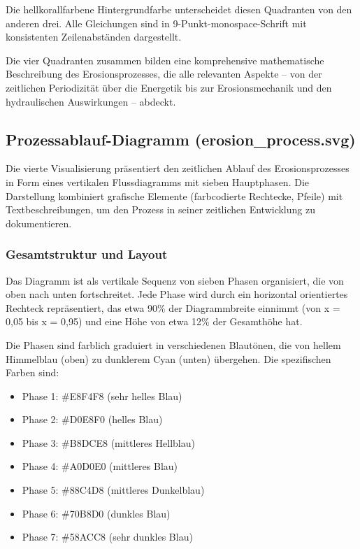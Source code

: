 Die hellkorallfarbene Hintergrundfarbe unterscheidet diesen Quadranten von den anderen drei. Alle Gleichungen sind in 9-Punkt-monospace-Schrift mit konsistenten Zeilenabständen dargestellt.

Die vier Quadranten zusammen bilden eine komprehensive mathematische Beschreibung des Erosionsprozesses, die alle relevanten Aspekte -- von der zeitlichen Periodizität über die Energetik bis zur Erosionsmechanik und den hydraulischen Auswirkungen -- abdeckt.

\subsection{Prozessablauf-Diagramm (erosion\_process.svg)}

Die vierte Visualisierung präsentiert den zeitlichen Ablauf des Erosionsprozesses in Form eines vertikalen Flussdiagramms mit sieben Hauptphasen. Die Darstellung kombiniert grafische Elemente (farbcodierte Rechtecke, Pfeile) mit Textbeschreibungen, um den Prozess in seiner zeitlichen Entwicklung zu dokumentieren.

\subsubsection*{Gesamtstruktur und Layout}

Das Diagramm ist als vertikale Sequenz von sieben Phasen organisiert, die von oben nach unten fortschreitet. Jede Phase wird durch ein horizontal orientiertes Rechteck repräsentiert, das etwa 90\% der Diagrammbreite einnimmt (von x = 0,05 bis x = 0,95) und eine Höhe von etwa 12\% der Gesamthöhe hat.

Die Phasen sind farblich graduiert in verschiedenen Blautönen, die von hellem Himmelblau (oben) zu dunklerem Cyan (unten) übergehen. Die spezifischen Farben sind:
\begin{itemize}
    \item Phase 1: \#E8F4F8 (sehr helles Blau)
    \item Phase 2: \#D0E8F0 (helles Blau)
    \item Phase 3: \#B8DCE8 (mittleres Hellblau)
    \item Phase 4: \#A0D0E0 (mittleres Blau)
    \item Phase 5: \#88C4D8 (mittleres Dunkelblau)
    \item Phase 6: \#70B8D0 (dunkles Blau)
    \item Phase 7: \#58ACC8 (sehr dunkles Blau)
\end{itemize}

